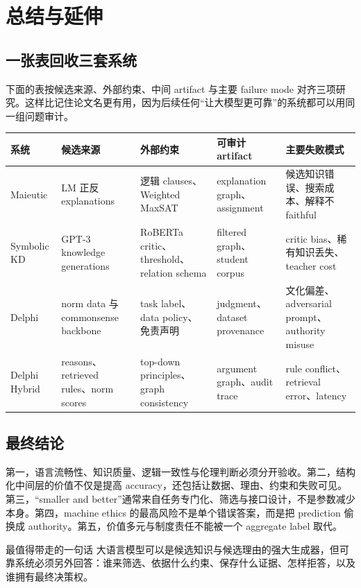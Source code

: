 \documentclass[a4paper]{article}
\begin{document}
\section{总结与延伸}

\subsection{一张表回收三套系统}

下面的表按候选来源、外部约束、中间 artifact 与主要 failure mode 对齐三项研究。这样比记住论文名更有用，因为后续任何“让大模型更可靠”的系统都可以用同一组问题审计。

\begin{longtable}{@{}L{0.13\textwidth}L{0.16\textwidth}L{0.19\textwidth}L{0.18\textwidth}L{0.19\textwidth}@{}}
\toprule
系统 & 候选来源 & 外部约束 & 可审计 artifact & 主要失败模式 \\
\midrule
Maieutic & LM 正反 explanations & 逻辑 clauses、Weighted MaxSAT & explanation graph、assignment & 候选知识错误、搜索成本、解释不 faithful \\
Symbolic KD & GPT-3 knowledge generations & RoBERTa critic、threshold、relation schema & filtered graph、student corpus & critic bias、稀有知识丢失、teacher cost \\
Delphi & norm data 与 commonsense backbone & task label、data policy、免责声明 & judgment、dataset provenance & 文化偏差、adversarial prompt、authority misuse \\
Delphi Hybrid & reasons、retrieved rules、norm scores & top-down principles、graph consistency & argument graph、audit trace & rule conflict、retrieval error、latency \\
\bottomrule
\end{longtable}

\subsection{最终结论}

第一，语言流畅性、知识质量、逻辑一致性与伦理判断必须分开验收。第二，结构化中间层的价值不仅是提高 accuracy，还包括让数据、理由、约束和失败可见。第三，“smaller and better”通常来自任务专门化、筛选与接口设计，不是参数减少本身。第四，machine ethics 的最高风险不是单个错误答案，而是把 prediction 偷换成 authority。第五，价值多元与制度责任不能被一个 aggregate label 取代。

\begin{importantbox}{最值得带走的一句话}
大语言模型可以是候选知识与候选理由的强大生成器，但可靠系统必须另外回答：谁来筛选、依据什么约束、保存什么证据、怎样拒答，以及谁拥有最终决策权。
\end{importantbox}
\end{document}
